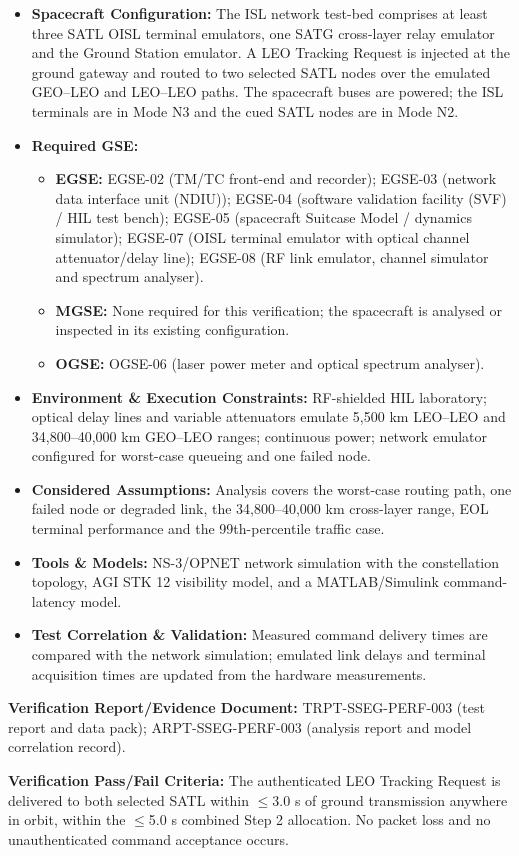 \begin{itemize}
\item \textbf{Spacecraft Configuration:} The ISL network test-bed comprises at least three SATL OISL terminal emulators, one SATG cross-layer relay emulator and the Ground Station emulator. A LEO Tracking Request is injected at the ground gateway and routed to two selected SATL nodes over the emulated GEO--LEO and LEO--LEO paths. The spacecraft buses are powered; the ISL terminals are in Mode N3 and the cued SATL nodes are in Mode N2.
\item \textbf{Required GSE:}
\begin{itemize}
\item \textbf{EGSE:} EGSE-02 (TM/TC front-end and recorder); EGSE-03 (network data interface unit (NDIU)); EGSE-04 (software validation facility (SVF) / HIL test bench); EGSE-05 (spacecraft Suitcase Model / dynamics simulator); EGSE-07 (OISL terminal emulator with optical channel attenuator/delay line); EGSE-08 (RF link emulator, channel simulator and spectrum analyser).
\item \textbf{MGSE:} None required for this verification; the spacecraft is analysed or inspected in its existing configuration.
\item \textbf{OGSE:} OGSE-06 (laser power meter and optical spectrum analyser).
\end{itemize}
\item \textbf{Environment \& Execution Constraints:} RF-shielded HIL laboratory; optical delay lines and variable attenuators emulate 5,500 km LEO--LEO and 34,800--40,000 km GEO--LEO ranges; continuous power; network emulator configured for worst-case queueing and one failed node.
\item \textbf{Considered Assumptions:} Analysis covers the worst-case routing path, one failed node or degraded link, the 34,800--40,000 km cross-layer range, EOL terminal performance and the 99th-percentile traffic case.
\item \textbf{Tools \& Models:} NS-3/OPNET network simulation with the constellation topology, AGI STK 12 visibility model, and a MATLAB/Simulink command-latency model.
\item \textbf{Test Correlation \& Validation:} Measured command delivery times are compared with the network simulation; emulated link delays and terminal acquisition times are updated from the hardware measurements.
\end{itemize}
\par\textbf{Verification Report/Evidence Document:} TRPT-SSEG-PERF-003 (test report and data pack); ARPT-SSEG-PERF-003 (analysis report and model correlation record).
\par\textbf{Verification Pass/Fail Criteria:} The authenticated LEO Tracking Request is delivered to both selected SATL within $\le$3.0 s of ground transmission anywhere in orbit, within the $\le$5.0 s combined Step 2 allocation. No packet loss and no unauthenticated command acceptance occurs.
\par\medskip
